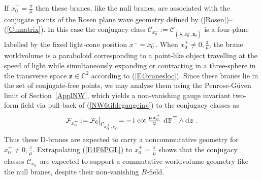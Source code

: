 \documentclass[11pt,a4paper]{article}
\newcommand{\ii}{{\rm i}}
\newcommand{\mbf}[1]{{\boldsymbol {#1} }}
\def\ii{{\,{\rm i}\,}}
\def\dd{{\rm d}}
\def\mz{{\mbf z}}
\newcommand{\complex}{{\mathbb C}} %
\newcommand{\beq}{\begin{eqnarray}}
\newcommand{\eeq}{\end{eqnarray}}
\begin{document}
If $x_0^+=\frac\pi\mu$ then these branes, like the null branes, are
associated with the conjugate points of the Rosen plane wave geometry
defined by (\ref{Rosen})--(\ref{Cumatrix}). In this case the conjugacy
class $\mathcal{C}_{x_0^-}:=\mathcal{C}_{(\frac\pi\mu,x_0^-,\mz_0)}$ is a
four-plane labelled by the fixed light-cone position $x^-=x_0^-$. When
$x_0^+\neq0,\frac\pi\mu$, the brane worldvolume is a paraboloid
corresponding to a point-like object travelling at the speed of light
while simultaneously expanding or contracting in a three-sphere in the
transverse space $\mz\in\complex^2$ according to (\ref{E4branesloc}). Since
these branes lie in the set of conjugate-free points, we may analyse
them using the Penrose-G\"uven limit of Section~\ref{ApplNW}, which
yields a non-vanishing gauge invariant two-form field via pull-back
of (\ref{NW6tildegaugeinv}) to the conjugacy classes as
\beq
\mathcal{F}_{x_0^+}:=\mathcal{F}_6\bigl|_{\mathcal{C}_{x_0^+,\chi_0^{~}}}
=-\ii\cot\mbox{$\frac{\mu\,x_0^+}2$}~\dd\overline{\mz}^{\,\top}\wedge\dd\mz
\ .
\label{E4F6PGL}\eeq
Thus these D-branes are expected to carry a noncommutative geometry
for $x_0^+\neq0,\frac\pi\mu$. Extrapolating (\ref{E4F6PGL}) to
$x_0^+=\frac\pi\mu$ shows that the conjugacy classes
$\mathcal{C}_{x_0^-}$ are expected to support a commutative
worldvolume geometry like the null branes, despite their non-vanishing
$B$-field.
\end{document}
